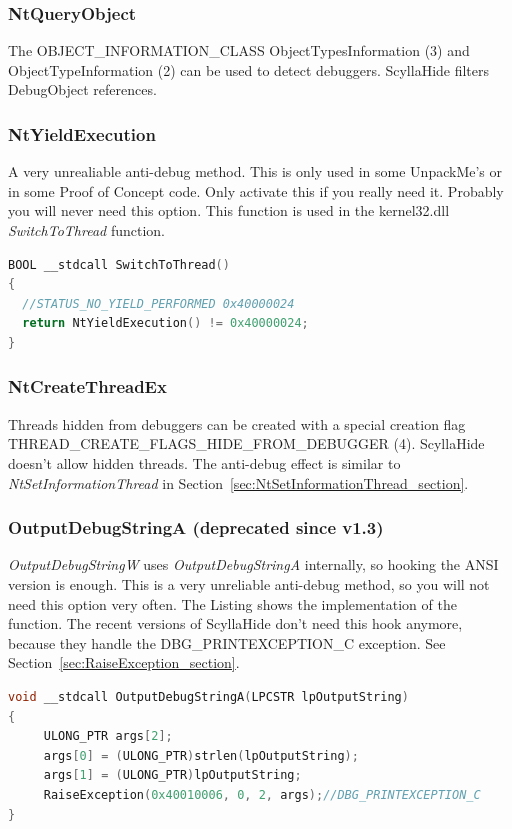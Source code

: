 \documentclass[10pt,a4paper]{article}
\begin{document}
\subsubsection{NtQueryObject}
The OBJECT\_INFORMATION\_CLASS ObjectTypesInformation (3) and ObjectTypeInformation (2) can be used to detect debuggers. ScyllaHide filters DebugObject references.

\subsubsection{NtYieldExecution}
A very unrealiable anti-debug method. This is only used in some UnpackMe's or in some Proof of Concept code. Only activate this if you really need it. Probably you will never need this option. This function is used in the kernel32.dll \textit{SwitchToThread} function.

\begin{lstlisting}[language=C, caption=SwitchToThread Implementation]
BOOL __stdcall SwitchToThread()
{
  //STATUS_NO_YIELD_PERFORMED 0x40000024
  return NtYieldExecution() != 0x40000024;
}
\end{lstlisting}

\subsubsection{NtCreateThreadEx}
Threads hidden from debuggers can be created with a special creation flag THREAD\_CREATE\_FLAGS\_HIDE\_FROM\_DEBUGGER (4). ScyllaHide doesn't allow hidden threads. The anti-debug effect is similar to \textit{NtSetInformationThread} in Section~\ref{sec:NtSetInformationThread_section}.

\subsubsection{OutputDebugStringA (deprecated since v1.3)}
\textit{OutputDebugStringW} uses \textit{OutputDebugStringA} internally, so hooking the ANSI version is enough. This is a very unreliable anti-debug method, so you will not need this option very often. The Listing shows the implementation of the function. The recent versions of ScyllaHide don't need this hook anymore, because they handle the DBG\_PRINTEXCEPTION\_C exception. See Section~\ref{sec:RaiseException_section}.

\begin{lstlisting}[language=C, caption=OutputDebugStringA Implementation]
void __stdcall OutputDebugStringA(LPCSTR lpOutputString)
{
     ULONG_PTR args[2];
     args[0] = (ULONG_PTR)strlen(lpOutputString);
     args[1] = (ULONG_PTR)lpOutputString;
     RaiseException(0x40010006, 0, 2, args);//DBG_PRINTEXCEPTION_C
}
\end{lstlisting}
\end{document}
